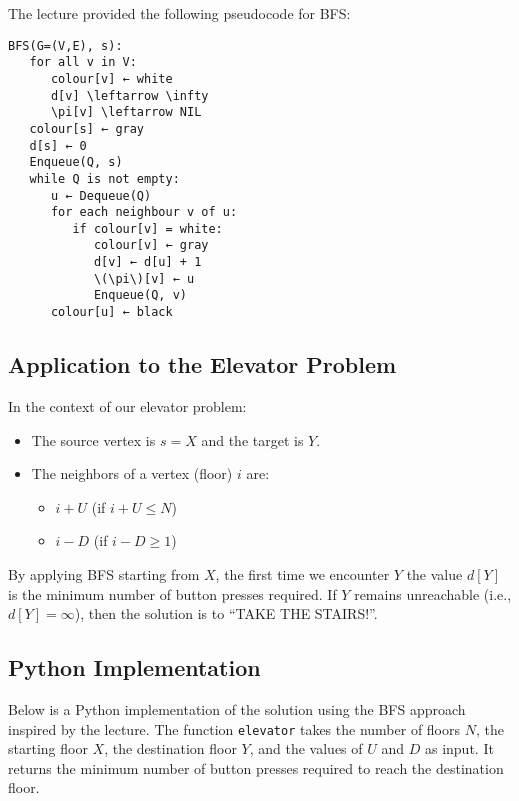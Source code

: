 \documentclass[12pt]{article}
\begin{document}
The lecture provided the following pseudocode for BFS:
\begin{verbatim}
BFS(G=(V,E), s):
   for all v in V:
      colour[v] ← white
      d[v] \leftarrow \infty
      \pi[v] \leftarrow NIL
   colour[s] ← gray
   d[s] ← 0
   Enqueue(Q, s)
   while Q is not empty:
      u ← Dequeue(Q)
      for each neighbour v of u:
         if colour[v] = white:
            colour[v] ← gray
            d[v] ← d[u] + 1
            \(\pi\)[v] ← u
            Enqueue(Q, v)
      colour[u] ← black
\end{verbatim}

\subsection*{Application to the Elevator Problem}
In the context of our elevator problem:
\begin{itemize}
    \item The source vertex is \(s=X\) and the target is \(Y\).
    \item The neighbors of a vertex (floor) \(i\) are:
    \begin{itemize}
        \item \(i+U\) (if \(i+U \leq N\))
        \item \(i-D\) (if \(i-D \geq 1\))
    \end{itemize}
\end{itemize}
By applying BFS starting from \(X\), the first time we encounter \(Y\) the value \(d[Y]\) is the minimum number of button presses required. If \(Y\) remains unreachable (i.e., \(d[Y]=\infty\)), then the solution is to ``TAKE THE STAIRS!''.

\subsection*{Python Implementation}
Below is a Python implementation of the solution using the BFS approach inspired by the lecture. The function \texttt{elevator} takes the number of floors \(N\), the starting floor \(X\), the destination floor \(Y\), and the values of \(U\) and \(D\) as input. It returns the minimum number of button presses required to reach the destination floor.
\end{document}
